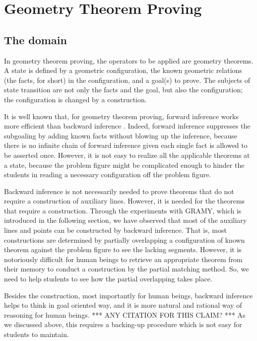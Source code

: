 
\section{Geometry Theorem Proving}

\subsection{The domain}

In geometry theorem proving, the operators to be applied are geometry
theorems.  A state is defined by a geometric configuration, the known
geometric relations (the facts, for short) in the configuration, and a
goal(s) to prove.  The subjects of state transition are not only the
facts and the goal, but also the configuration; the configuration is
changed by a construction.

It is well known that, for geometry theorem proving, forward inference
works more efficient than backward inference \cite{Nevins75}.  Indeed,
forward inference suppresses the subgoaling by adding known facts
without blowing up the inference, because there is no infinite chain of
forward inference given each single fact is allowed to be asserted once.
However, it is not easy to realize all the applicable theorems at a
state, because the problem figure might be complicated enough to hinder
the students in reading a necessary configuration off the problem
figure.

Backward inference is not necessarily needed to prove theorems that do
not require a construction of auxiliary lines.  However, it is needed
for the theorems that require a construction.  Through the experiments
with GRAMY, which is introduced in the following section, we have
observed that most of the auxiliary lines and points can be constructed
by backward inference.  That is, most constructions are determined by
partially overlapping a configuration of known theorem against the
problem figure to see the lacking segments.  However, it is notoriously
difficult for human beings to retrieve an appropriate theorem from their
memory to conduct a construction by the partial matching method.  So, we
need to help students to see how the partial overlapping takes place.

Besides the construction, most importantly for human beings, backward
inference helps to think in goal oriented way, and it is more natural
and rational way of reasoning for human beings.  *** ANY CITATION FOR
THIS CLAIM?  *** As we discussed above, this requires a backing-up
procedure which is not easy for students to maintain.  

